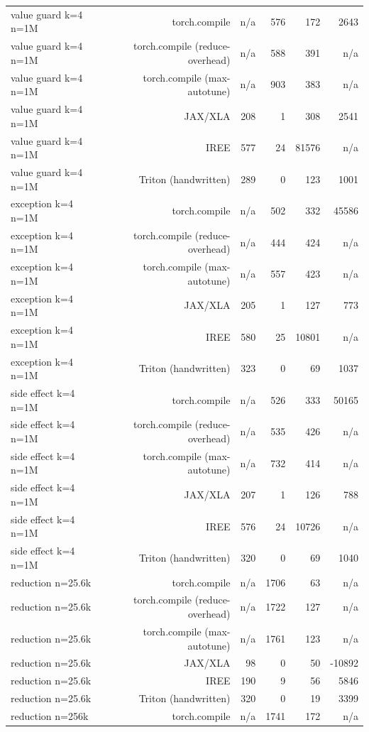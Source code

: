 \begin{tabular}{lrrrrr}
value guard k=4 n=1M & torch.compile & n/a & 576 & 172 & 2643 \\
value guard k=4 n=1M & torch.compile (reduce-overhead) & n/a & 588 & 391 & n/a \\
value guard k=4 n=1M & torch.compile (max-autotune) & n/a & 903 & 383 & n/a \\
value guard k=4 n=1M & JAX/XLA & 208 & 1 & 308 & 2541 \\
value guard k=4 n=1M & IREE & 577 & 24 & 81576 & n/a \\
value guard k=4 n=1M & Triton (handwritten) & 289 & 0 & 123 & 1001 \\
exception k=4 n=1M & torch.compile & n/a & 502 & 332 & 45586 \\
exception k=4 n=1M & torch.compile (reduce-overhead) & n/a & 444 & 424 & n/a \\
exception k=4 n=1M & torch.compile (max-autotune) & n/a & 557 & 423 & n/a \\
exception k=4 n=1M & JAX/XLA & 205 & 1 & 127 & 773 \\
exception k=4 n=1M & IREE & 580 & 25 & 10801 & n/a \\
exception k=4 n=1M & Triton (handwritten) & 323 & 0 & 69 & 1037 \\
side effect k=4 n=1M & torch.compile & n/a & 526 & 333 & 50165 \\
side effect k=4 n=1M & torch.compile (reduce-overhead) & n/a & 535 & 426 & n/a \\
side effect k=4 n=1M & torch.compile (max-autotune) & n/a & 732 & 414 & n/a \\
side effect k=4 n=1M & JAX/XLA & 207 & 1 & 126 & 788 \\
side effect k=4 n=1M & IREE & 576 & 24 & 10726 & n/a \\
side effect k=4 n=1M & Triton (handwritten) & 320 & 0 & 69 & 1040 \\
reduction n=25.6k & torch.compile & n/a & 1706 & 63 & n/a \\
reduction n=25.6k & torch.compile (reduce-overhead) & n/a & 1722 & 127 & n/a \\
reduction n=25.6k & torch.compile (max-autotune) & n/a & 1761 & 123 & n/a \\
reduction n=25.6k & JAX/XLA & 98 & 0 & 50 & -10892 \\
reduction n=25.6k & IREE & 190 & 9 & 56 & 5846 \\
reduction n=25.6k & Triton (handwritten) & 320 & 0 & 19 & 3399 \\
reduction n=256k & torch.compile & n/a & 1741 & 172 & n/a \\

\end{tabular}
